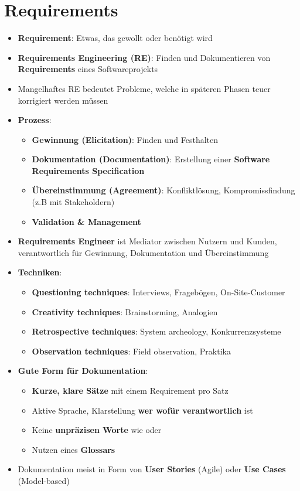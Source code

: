 \section{Requirements}
\label{rq:sec:requirements}

\begin{itemize}
	\item \textbf{Requirement}: Etwas, das gewollt oder benötigt wird
	\item \textbf{Requirements Engineering (RE)}: Finden und Dokumentieren von \textbf{Requirements} eines Softwareprojekts
	\item Mangelhaftes RE bedeutet Probleme, welche in späteren Phasen teuer korrigiert werden müssen
	\item \textbf{Prozess}:
	\begin{itemize}
		\item \textbf{Gewinnung (Elicitation)}: Finden und Festhalten
		\item \textbf{Dokumentation (Documentation)}: Erstellung einer \textbf{Software Requirements Specification}
		\item \textbf{Übereinstimmung (Agreement)}: Konfliktlösung, Kompromissfindung (z.B mit Stakeholdern)
		\item \textbf{Validation \& Management}
	\end{itemize}
	\item \textbf{Requirements Engineer} ist Mediator zwischen Nutzern und Kunden, verantwortlich für Gewinnung, Dokumentation und Übereinstimmung
	\item \textbf{Techniken}:
	\begin{itemize}
		\item \textbf{Questioning techniques}: Interviews, Fragebögen, On-Site-Customer
		\item \textbf{Creativity techniques}: Brainstorming, Analogien
		\item \textbf{Retrospective techniques}: System archeology, Konkurrenzsysteme
		\item \textbf{Observation techniques}: Field observation, Praktika
	\end{itemize}
	\item \textbf{Gute Form für Dokumentation}:
	\begin{itemize}
		\item \textbf{Kurze, klare Sätze} mit einem Requirement pro Satz
		\item Aktive Sprache, Klarstellung \textbf{wer wofür verantwortlich} ist
		\item Keine \textbf{unpräzisen Worte} wie  oder 
		\item Nutzen eines \textbf{Glossars}
	\end{itemize}
	\item Dokumentation meist in Form von \textbf{User Stories} (Agile) oder \textbf{Use Cases} (Model-based)
\end{itemize}

